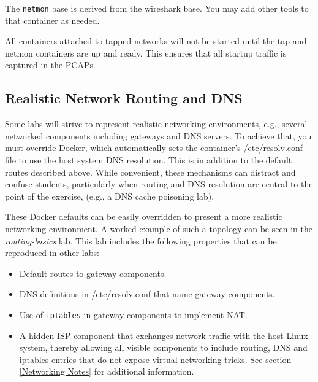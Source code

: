 \documentclass[12pt]{article}
\begin{document}
The {\tt netmon} base is derived from the wireshark base.  You may add other tools to that container as needed.

All containers attached to tapped networks will not be started until the tap and netmon containers are up
and ready.  This ensures that all startup traffic is captured in the PCAPs.

\subsection{Realistic Network Routing and DNS}
Some labs will strive to represent realistic networking environments, 
e.g., several networked components including gateways and DNS servers.
To achieve that, you must override Docker, which automatically sets 
the container's /etc/resolv.conf file to use the
host system DNS resolution.  This is in addition to the default routes described
above.  While convenient, these mechanisms can distract and confuse students, particularly
when routing and DNS resolution are central to the point of the exercise, (e.g.,
a DNS cache poisoning lab).

These Docker defaults can be easily overridden to present a more realistic networking
environment.  A worked example of such a topology can be seen in the \textit{routing-basics} lab.
This lab includes the following properties that can be reproduced in other labs:
\begin{itemize}
\item Default routes to gateway components.
\item DNS definitions in /etc/resolv.conf that name gateway components.
\item Use of \texttt{iptables} in gateway components to implement NAT.
\item A hidden ISP component that exchanges network traffic with the host Linux system,
thereby allowing all visible components to include routing, DNS and iptables entries that do not
expose virtual networking tricks.  See section \ref{Networking Notes} for additional information.

\end{itemize}
\end{document}
